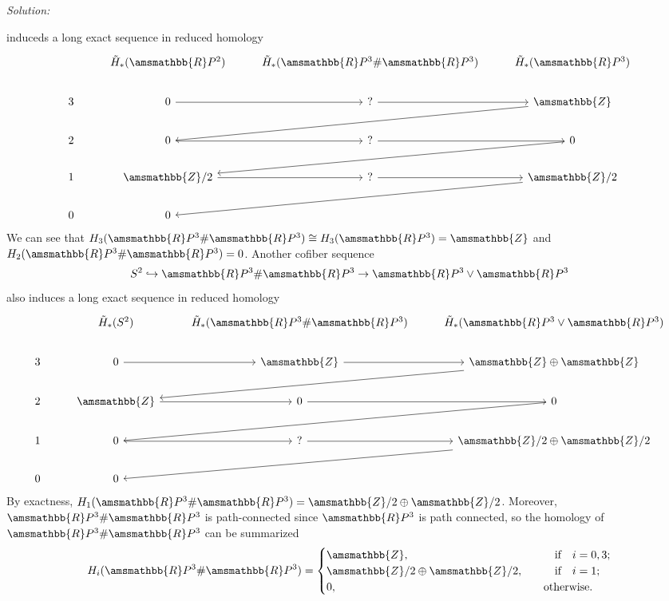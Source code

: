 \documentclass[a4paper, 12pt]{article}
\newenvironment{solution}
    {\textit{Solution:}}
    {}
\renewcommand{\mathbb}{\amsmathbb}
\newcommand{\iif}{\ \ \ \text{if}\ \ \ }
\begin{document}
\begin{solution}
\begin{enumerate}[(1)]
induceds a long exact sequence in reduced homology 
\[\begin{tikzcd}
	& {\tilde{H}_*(\mathbb{R}P^2)} & {\tilde{H}_*(\mathbb{R}P^3\#\mathbb{R}P^3)} & {\tilde{H}_*(\mathbb{R}P^3)} \\
	3 & 0 & {?} & {\mathbb{Z}} \\
	2 & 0 & {?} & 0 \\
	1 & {\mathbb{Z}/2} & {?} & {\mathbb{Z}/2} \\
	0 & 0
	\arrow[from=2-2, to=2-3]
	\arrow[from=2-3, to=2-4]
	\arrow[from=2-4, to=3-2]
	\arrow[from=3-2, to=3-3]
	\arrow[from=3-3, to=3-4]
	\arrow[from=3-4, to=4-2]
	\arrow[from=4-2, to=4-3]
	\arrow[from=4-3, to=4-4]
	\arrow[from=4-4, to=5-2]
\end{tikzcd}\]
We can see that \(H_3(\mathbb{R}P^3\#\mathbb{R}P^3)\cong H_3(\mathbb{R}P^3)=\mathbb{Z}\) and \(H_2(\mathbb{R}P^3\# \mathbb{R}P^3)=0\). Another cofiber sequence 
\[S^2\hookrightarrow \mathbb{R}P^3\#\mathbb{R}P^3\rightarrow \mathbb{R}P^3\vee \mathbb{R}P^3\]
also induces a long exact sequence in reduced homology 
\[\begin{tikzcd}
	& {\tilde{H}_*(S^2)} & {\tilde{H}_*(\mathbb{R}P^3\#\mathbb{R}P^3)} & {\tilde{H}_*(\mathbb{R}P^3\vee \mathbb{R}P^3)} \\
	3 & 0 & {\mathbb{Z}} & {\mathbb{Z}\oplus \mathbb{Z}} \\
	2 & {\mathbb{Z}} & 0 & 0 \\
	1 & 0 & {?} & {\mathbb{Z}/2\oplus\mathbb{Z}/2} \\
	0 & 0
	\arrow[from=2-2, to=2-3]
	\arrow[from=2-3, to=2-4]
	\arrow[from=2-4, to=3-2]
	\arrow[from=3-2, to=3-3]
	\arrow[from=3-3, to=3-4]
	\arrow[from=3-4, to=4-2]
	\arrow[from=4-2, to=4-3]
	\arrow[from=4-3, to=4-4]
	\arrow[from=4-4, to=5-2]
\end{tikzcd}\]
By exactness, \(H_1(\mathbb{R}P^3\# \mathbb{R}P^3)=\mathbb{Z}/2\oplus \mathbb{Z}/2\). Moreover, \(\mathbb{R}P^3\# \mathbb{R}P^3\) is path-connected since \(\mathbb{R}P^3\) is path connected, so the homology of \(\mathbb{R}P^3\# \mathbb{R}P^3\) can be summarized 
\[H_i(\mathbb{R}P^3\# \mathbb{R}P^3)=\begin{cases}
	\mathbb{Z},&\ \ \ \iif i=0,3;\\ 
	\mathbb{Z}/2\oplus \mathbb{Z}/2,&\ \ \ \iif i=1;\\ 
	0,&\ \ \ \text{otherwise}.
\end{cases}\]
\end{enumerate} 
\end{solution}
\end{document}
